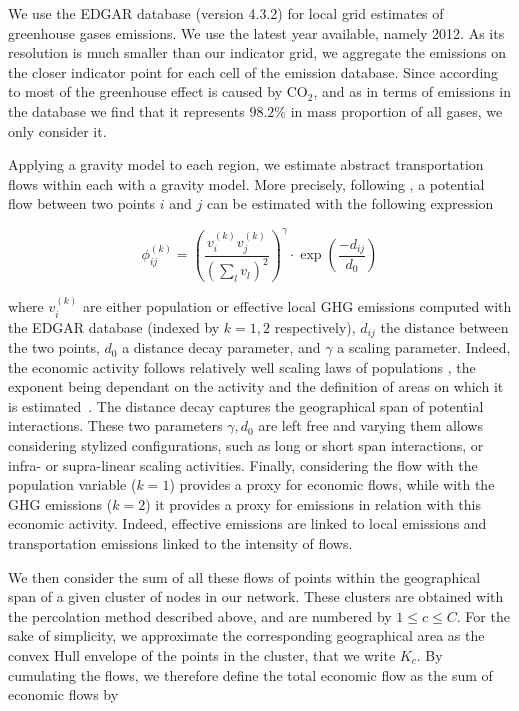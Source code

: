\documentclass{jimis-en}
\begin{document}
We use the EDGAR database \citep{janssens2017edgar} (version 4.3.2) for local grid estimates of greenhouse gases emissions. We use the latest year available, namely 2012. As its resolution is much smaller than our indicator grid, we aggregate the emissions on the closer indicator point for each cell of the emission database. Since according to \cite{lashof1990relative} most of the greenhouse effect is caused by $\textrm{CO}_2$, and as in terms of emissions in the database we find that it represents $98.2\%$ in mass proportion of all gases, we only consider it.

Applying a gravity model to each region, we estimate abstract transportation flows within each with a gravity model. More precisely, following \cite{raimbault2018indirect}, a potential flow between two points $i$ and $j$ can be estimated with the following expression 

\begin{equation}
\phi_{ij}^{(k)} = \left(\frac{v^{(k)}_i v^{(k)}_j}{(\sum_l v_l)^2}\right)^\gamma \cdot \exp\left(\frac{-d_{ij}}{d_0}\right)
\end{equation}

where $v^{(k)}_i$ are either population or effective local GHG emissions computed with the EDGAR database (indexed by $k = 1,2$ respectively), $d_{ij}$ the distance between the two points, $d_0$ a distance decay parameter, and $\gamma$ a scaling parameter. Indeed, the economic activity follows relatively well scaling laws of populations \citep{bettencourt2007growth}, the exponent being dependant on the activity and the definition of areas on which it is estimated~\citep{cottineau2017diverse}. The distance decay captures the geographical span of potential interactions. These two parameters $\gamma,d_0$ are left free and varying them allows considering stylized configurations, such as long or short span interactions, or infra- or supra-linear scaling activities. Finally, considering the flow with the population variable ($k=1$) provides a proxy for economic flows, while with the GHG emissions ($k=2$) it provides a proxy for emissions in relation with this economic activity. Indeed, effective emissions are linked to local emissions and transportation emissions linked to the intensity of flows.

We then consider the sum of all these flows of points within the geographical span of a given cluster of nodes in our network. These clusters are obtained with the percolation method described above, and are numbered by $1 \leq c \leq C$. For the sake of simplicity, we approximate the corresponding geographical area as the convex Hull envelope of the points in the cluster, that we write $K_c$. By cumulating the flows, we therefore define the total economic flow as the sum of economic flows by 
\end{document}
